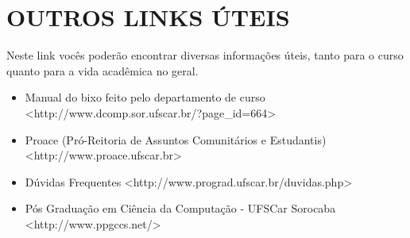 \section{OUTROS LINKS ÚTEIS}
Neste link vocês poderão encontrar diversas informações úteis, tanto para o curso quanto para a vida acadêmica no geral.

\begin{itemize}
\item Manual do bixo feito pelo departamento de curso \newline <http://www.dcomp.sor.ufscar.br/?page\_id=664>

\item Proace (Pró-Reitoria de Assuntos Comunitários e Estudantis) \newline <http://www.proace.ufscar.br>

\item Dúvidas Frequentes \newline <http://www.prograd.ufscar.br/duvidas.php>


\item Pós Graduação em Ciência da Computação - UFSCar Sorocaba \newline <http://www.ppgccs.net/>
\end{itemize}
